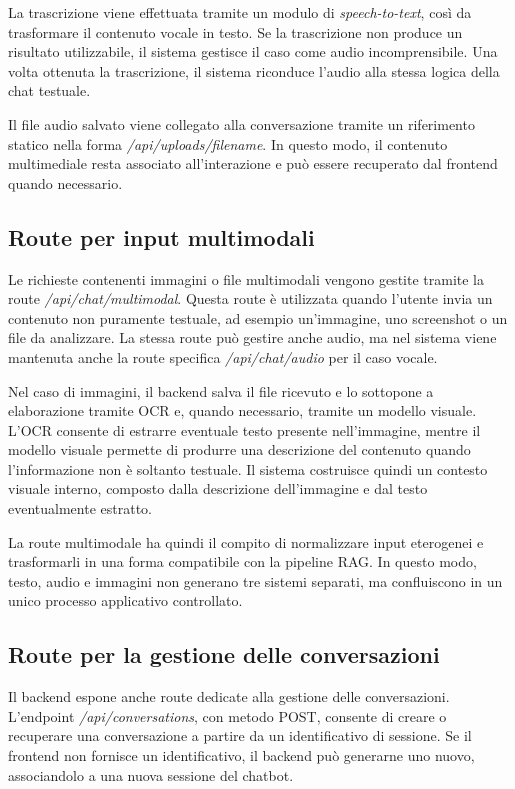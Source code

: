 La trascrizione viene effettuata tramite un modulo di \textit{speech-to-text}, così da trasformare il contenuto vocale in testo. Se la trascrizione non produce un risultato utilizzabile, il sistema gestisce il caso come audio incomprensibile. Una volta ottenuta la trascrizione, il sistema riconduce l’audio alla stessa logica della chat testuale.

Il file audio salvato viene collegato alla conversazione tramite un riferimento statico nella forma \textit{/api/uploads/{filename}}. In questo modo, il contenuto multimediale resta associato all’interazione e può essere recuperato dal frontend quando necessario.

\subsection*{Route per input multimodali}

Le richieste contenenti immagini o file multimodali vengono gestite tramite la route \textit{/api/chat/multimodal}. Questa route è utilizzata quando l’utente invia un contenuto non puramente testuale, ad esempio un’immagine, uno screenshot o un file da analizzare. La stessa route può gestire anche audio, ma nel sistema viene mantenuta anche la route specifica \textit{/api/chat/audio} per il caso vocale.

Nel caso di immagini, il backend salva il file ricevuto e lo sottopone a elaborazione tramite OCR e, quando necessario, tramite un modello visuale. L’OCR consente di estrarre eventuale testo presente nell’immagine, mentre il modello visuale permette di produrre una descrizione del contenuto quando l’informazione non è soltanto testuale. Il sistema costruisce quindi un contesto visuale interno, composto dalla descrizione dell’immagine e dal testo eventualmente estratto.

La route multimodale ha quindi il compito di normalizzare input eterogenei e trasformarli in una forma compatibile con la pipeline RAG. In questo modo, testo, audio e immagini non generano tre sistemi separati, ma confluiscono in un unico processo applicativo controllato.

\subsection*{Route per la gestione delle conversazioni}

Il backend espone anche route dedicate alla gestione delle conversazioni. L’endpoint \textit{/api/conversations}, con metodo POST, consente di creare o recuperare una conversazione a partire da un identificativo di sessione. Se il frontend non fornisce un identificativo, il backend può generarne uno nuovo, associandolo a una nuova sessione del chatbot.

